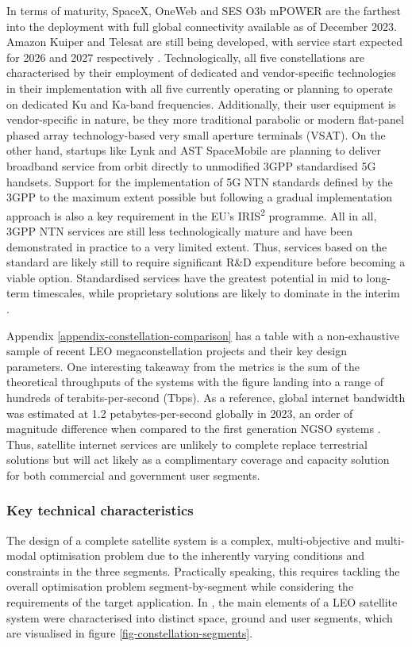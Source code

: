 \documentclass[english, 12pt, a4paper, elec, utf8, a-1b, online]{aaltothesis}
\begin{document}
In terms of maturity, SpaceX, OneWeb and SES O3b mPOWER are the farthest into the deployment with full global connectivity available as of December 2023.
Amazon Kuiper and Telesat are still being developed, with service start expected for 2026 and 2027 respectively \cite{euroconsult-ngso-tracker-2023-q3}.
Technologically, all five constellations are characterised by their employment of dedicated and vendor-specific technologies in their implementation with all five currently operating or planning to operate on dedicated Ku and Ka-band frequencies.
Additionally, their user equipment is vendor-specific in nature, be they more traditional parabolic or modern flat-panel phased array technology-based very small aperture terminals (VSAT).
On the other hand, startups like Lynk and AST SpaceMobile are planning to deliver broadband service from orbit directly to unmodified 3GPP standardised 5G handsets.
Support for the implementation of 5G NTN standards defined by the 3GPP to the maximum extent possible but following a gradual implementation approach is also a key requirement in the EU's IRIS\textsuperscript{2} programme.
All in all, 3GPP NTN services are still less technologically mature and have been demonstrated in practice to a very limited extent.
Thus, services based on the standard are likely still to require significant R\&D expenditure before becoming a viable option.
Standardised services have the greatest potential in mid to long-term timescales, while proprietary solutions are likely to dominate in the interim \cite{iris2-industryday-2023-03, nsr-5g-via-satellite-2023, nsr-direct-to-device-market-2023}.

Appendix \ref{appendix-constellation-comparison} has a table with a non-exhaustive sample of recent LEO megaconstellation projects and their key design parameters.
One interesting takeaway from the metrics is the sum of the theoretical throughputs of the systems with the figure landing into a range of hundreds of terabits-per-second (Tbps).
As a reference, global internet bandwidth was estimated at 1.2 petabytes-per-second globally in 2023, an order of magnitude difference when compared to the first generation NGSO systems \cite{telegeography-ip-networks-2023}.
Thus, satellite internet services are unlikely to complete replace terrestrial solutions but will act likely as a complimentary coverage and capacity solution for both commercial and government user segments.

\subsubsection{Key technical characteristics} \label{ch-constellation-characteristics}
The design of a complete satellite system is a complex, multi-objective and multi-modal optimisation problem due to the inherently varying conditions and constraints in the three segments.
Practically speaking, this requires tackling the overall optimisation problem segment-by-segment while considering the requirements of the target application.
In \cite{celikbilek2022survey}, the main elements of a LEO satellite system were characterised into distinct space, ground and user segments, which are visualised in figure \ref{fig-constellation-segments}. %
\end{document}
